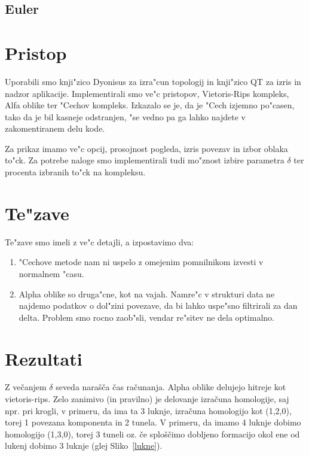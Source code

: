 \documentclass[11pt]{article}
\begin{document}
\subsection{Euler}

\section{Pristop}

Uporabili smo knji"zico Dyonisus za izra"cun topologij in knji"zico QT za izris in nadzor aplikacije. Implementirali smo ve"c pristopov, Vietoris-Rips kompleks, Alfa oblike ter "Cechov kompleks. Izkazalo se je, da je "Cech izjemno po"casen, tako da je bil kasneje odstranjen, "se vedno pa ga lahko najdete v zakomentiranem delu kode.

Za prikaz imamo ve"c opcij, prosojnost pogleda, izris povezav in izbor oblaka to"ck. Za potrebe naloge smo implementirali tudi mo"znost izbire parametra $\delta$ ter procenta izbranih to"ck na kompleksu.

\section{Te"zave}

Te"zave smo imeli z ve"c detajli, a izpostavimo dva:

\begin{enumerate}
\item "Cechove metode nam ni uspelo z omejenim pomnilnikom izvesti v normalnem "casu.
\item Alpha oblike so druga"cne, kot na vajah. Namre"c v strukturi data ne najdemo podatkov o dol"zini povezave, da bi lahko uspe"sno filtrirali za dan delta. Problem smo rocno zaob"sli, vendar re"sitev ne dela optimalno.
\end{enumerate}

\section{Rezultati}

Z večanjem $\delta$ seveda narašča čas računanja. Alpha oblike delujejo hitreje kot vietoris-rips. Zelo zanimivo (in pravilno) je delovanje izračuna homologije, saj npr. pri krogli, v primeru, da ima ta 3 luknje, izračuna homologijo kot (1,2,0), torej 1 povezana komponenta in 2 tunela. V primeru, da imamo 4 luknje dobimo homologijo (1,3,0), torej 3 tuneli oz. če sploščimo dobljeno formacijo okol ene od lukenj dobimo 3 luknje (glej Sliko~\ref{lukne}).
\end{document}
